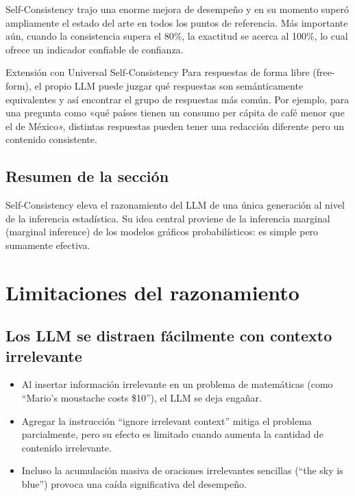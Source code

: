 \documentclass[a4paper]{article}
\begin{document}
Self-Consistency trajo una enorme mejora de desempeño y en su momento superó ampliamente el estado del arte en todos los puntos de referencia. Más importante aún, cuando la consistencia supera el 80\%, la exactitud se acerca al 100\%, lo cual ofrece un indicador confiable de confianza.

\begin{knowledgebox}{Extensión con Universal Self-Consistency}
Para respuestas de forma libre (free-form), el propio LLM puede juzgar qué respuestas son semánticamente equivalentes y así encontrar el grupo de respuestas más común. Por ejemplo, para una pregunta como «qué países tienen un consumo per cápita de café menor que el de México», distintas respuestas pueden tener una redacción diferente pero un contenido consistente.
\end{knowledgebox}

\subsection{Resumen de la sección}

Self-Consistency eleva el razonamiento del LLM de una única generación al nivel de la inferencia estadística. Su idea central proviene de la inferencia marginal (marginal inference) de los modelos gráficos probabilísticos: es simple pero sumamente efectiva.

\section{Limitaciones del razonamiento}

\subsection{Los LLM se distraen fácilmente con contexto irrelevante}

\begin{itemize}
    \item Al insertar información irrelevante en un problema de matemáticas (como ``Mario's moustache costs \$10''), el LLM se deja engañar.
    \item Agregar la instrucción ``ignore irrelevant context'' mitiga el problema parcialmente, pero su efecto es limitado cuando aumenta la cantidad de contenido irrelevante.
    \item Incluso la acumulación masiva de oraciones irrelevantes sencillas (``the sky is blue'') provoca una caída significativa del desempeño.
\end{itemize}
\end{document}
